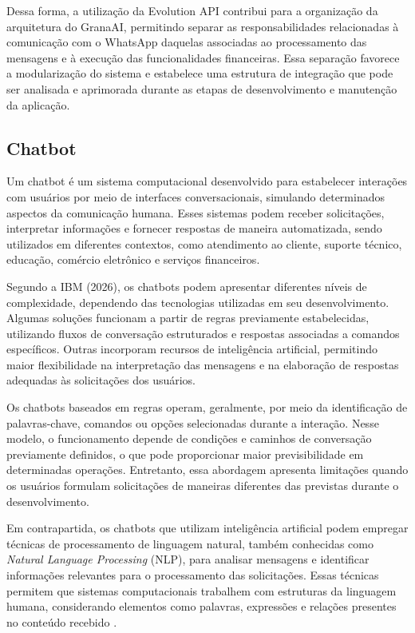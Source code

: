 Dessa forma, a utilização da Evolution API contribui para a organização da arquitetura do GranaAI, permitindo separar as responsabilidades relacionadas à comunicação com o WhatsApp daquelas associadas ao processamento das mensagens e à execução das funcionalidades financeiras. Essa separação favorece a modularização do sistema e estabelece uma estrutura de integração que pode ser analisada e aprimorada durante as etapas de desenvolvimento e manutenção da aplicação.

\subsection{Chatbot}

Um chatbot é um sistema computacional desenvolvido para estabelecer interações com usuários por meio de interfaces conversacionais, simulando determinados aspectos da comunicação humana. Esses sistemas podem receber solicitações, interpretar informações e fornecer respostas de maneira automatizada, sendo utilizados em diferentes contextos, como atendimento ao cliente, suporte técnico, educação, comércio eletrônico e serviços financeiros.

Segundo a IBM (2026), os chatbots podem apresentar diferentes níveis de complexidade, dependendo das tecnologias utilizadas em seu desenvolvimento. Algumas soluções funcionam a partir de regras previamente estabelecidas, utilizando fluxos de conversação estruturados e respostas associadas a comandos específicos. Outras incorporam recursos de inteligência artificial, permitindo maior flexibilidade na interpretação das mensagens e na elaboração de respostas adequadas às solicitações dos usuários.

Os chatbots baseados em regras operam, geralmente, por meio da identificação de palavras-chave, comandos ou opções selecionadas durante a interação. Nesse modelo, o funcionamento depende de condições e caminhos de conversação previamente definidos, o que pode proporcionar maior previsibilidade em determinadas operações. Entretanto, essa abordagem apresenta limitações quando os usuários formulam solicitações de maneiras diferentes das previstas durante o desenvolvimento.

Em contrapartida, os chatbots que utilizam inteligência artificial podem empregar técnicas de processamento de linguagem natural, também conhecidas como \textit{Natural Language Processing} (NLP), para analisar mensagens e identificar informações relevantes para o processamento das solicitações. Essas técnicas permitem que sistemas computacionais trabalhem com estruturas da linguagem humana, considerando elementos como palavras, expressões e relações presentes no conteúdo recebido \cite{ibm_chatbot_2026}.

